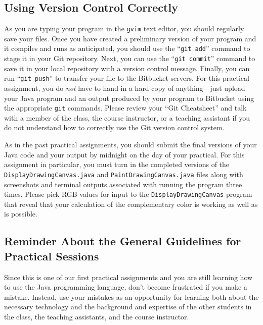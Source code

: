\vspace*{-.1in}
\subsection*{Using Version Control Correctly}

As you are typing your program in the {\tt gvim} text editor, you should regularly save your files.  Once you have
created a preliminary version of your program and it compiles and runs as anticipated, you should use the ``{\tt git
add}'' command to stage it in your Git repository.  Next, you can use the ``{\tt git commit}'' command to save it in
your local repository with a version control message.  Finally, you can run ``{\tt git push}'' to transfer your file to
the Bitbucket servers.  For this practical assignment, you do {\em not} have to hand in a hard copy of anything---just
upload your Java program and an output produced by your program to Bitbucket using the appropriate {\tt git} commands.
Please review your ``Git Cheatsheet'' and talk with a member of the class, the course instructor, or a teaching
assistant if you do not understand how to correctly use the Git version control system.

As in the past practical assignments, you should submit the final versions of your Java code and your output by midnight
on the day of your practical. For this assignment in particular, you must turn in the completed versions of the {\tt
DisplayDrawingCanvas.java} and {\tt PaintDrawingCanvas.java} files along with screenshots and terminal outputs
associated with running the program three times. Please pick RGB values for input to the {\tt DisplayDrawingCanvas}
program that reveal that your calculation of the complementary color is working as well as is possible.

\vspace*{-.1in}
\subsection*{Reminder About the General Guidelines for Practical Sessions}

Since this is one of our first practical assignments and you are still learning how to use the Java programming
language, don't become frustrated if you make a mistake. Instead, use your mistakes as an opportunity for learning both
about the necessary technology and the background and expertise of the other students in the class, the teaching
assistants, and the course instructor.

